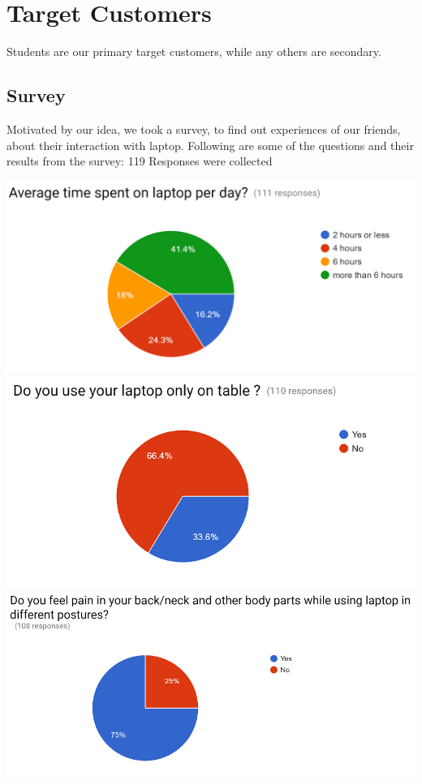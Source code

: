 \chapter{Target Customers}

Students are our primary target customers, while any others are secondary. 

\section{Survey}

Motivated by our idea, we took a survey, to find out experiences of our friends, about their interaction with laptop. Following are some of the questions and their results from the survey:
119 Responses were collected

\includegraphics[scale=0.5]{sur1}
\newpage
\includegraphics[width=\linewidth]{sur2}
\includegraphics[width=\linewidth]{sur3}
